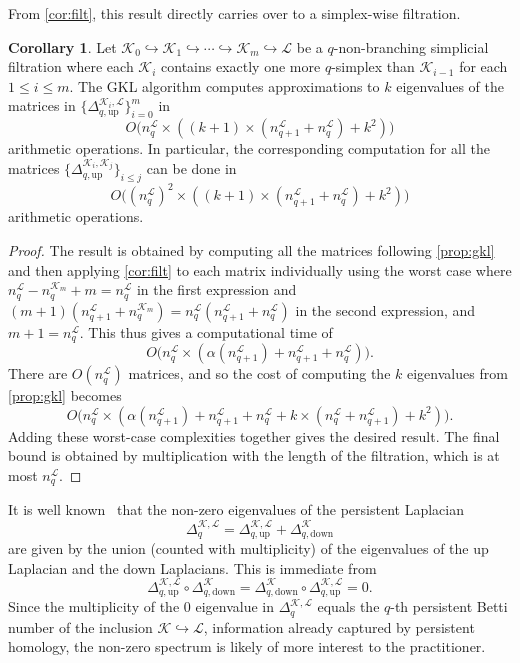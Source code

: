 \documentclass{article}
\theoremstyle{definition}
\newtheorem{corollary}[theorem]{Corollary}
\newcommand{\KK}{\mathcal{K}}
\newcommand{\LL}{\mathcal{L}}
\begin{document}
From \cref{cor:filt}, this result directly carries over to a simplex-wise filtration.

\begin{corollary}\label{cor:filt_complexity} %
Let $\KK_0\hookrightarrow\KK_1 \hookrightarrow\cdots\hookrightarrow \KK_m \hookrightarrow \LL$ be a $q$-non-branching simplicial filtration where each $\KK_i$ contains exactly one more $q$-simplex than $\KK_{i-1}$ for each $1\leq i\leq m$. 
The GKL algorithm computes approximations to $k$ eigenvalues of the matrices in $\{\Delta_{q, \text{up}}^{\KK_i, \LL}\}_{i=0}^{m}$ in
\[
O\Big(n_q^\LL\times \left((k+1)\times (n_{q+1}^\LL+n_q^\LL)+k^2\right)\Big)
\]
arithmetic operations.
In particular, the corresponding computation for all the matrices $\{\Delta_{q, \text{up}}^{\KK_i, \KK_j}\}_{i\leq j}$ can be done in
\[
O\Big((n_q^\LL)^2\times \left((k+1)\times (n_{q+1}^\LL+n_q^\LL)+k^2\right)\Big)
\]
arithmetic operations.
\end{corollary}
\begin{proof}
The result is obtained by computing all the matrices following  \cref{prop:gkl} and then applying \cref{cor:filt} to each matrix individually using the worst case where $n_q^\LL-n_q^{\KK_m}+m = n_q^\LL$ in the first expression and $(m+1)(n_{q+1}^\LL + n_q^{\KK_m}) = n_{q}^\LL(n_{q+1}^\LL + n_q^\LL)$ in the second expression, and $m+1=n_{q}^\LL$. This thus gives a computational time of
\[
O\Big(n_q^\LL\times \left(\alpha(n_{q+1}^\LL) + n_{q+1}^\LL + n_q^\LL\right)\Big).
\]
There are $O(n_q^\LL)$ matrices, and so the cost of computing the $k$ eigenvalues from \cref{prop:gkl} becomes 
\[
O\Big(n_q^\LL\times\left( \alpha(n_{q+1}^\LL)+n_{q+1}^\LL+n_q^\LL+k\times (n_q^\LL+n_{q+1}^\LL)+k^2\right)\Big).
\]
Adding these worst-case complexities together gives the desired result. The final bound is obtained by multiplication with the length of the filtration, which is at most $n_q^\LL$.
\end{proof}

It is well known~\cite[Section 2]{horak2013spectra} that the non-zero eigenvalues of the persistent Laplacian \[\Delta_{q}^{\mathcal{K}, \mathcal{L}} = \Delta_{q, \mathrm{up}}^{\mathcal{K}, \mathcal{L}} + \Delta_{q, \mathrm{down}}^{\mathcal{K}}\]
are given by the union (counted with multiplicity) of the eigenvalues of the up Laplacian and the down Laplacians. This is immediate from 
\[\Delta_{q, \mathrm{up}}^{\mathcal{K}, \mathcal{L}}\circ \Delta_{q, \mathrm{down}}^{\mathcal{K}} = \Delta_{q, \mathrm{down}}^{\mathcal{K}}\circ \Delta_{q, \mathrm{up}}^{\mathcal{K}, \mathcal{L}}=0.\]
Since the multiplicity of the $0$ eigenvalue in $\Delta_{q}^{\mathcal{K}, \mathcal{L}}$ equals the $q$-th persistent Betti number of the inclusion $\KK\hookrightarrow \LL$, information already captured by persistent homology, the non-zero spectrum is likely of more interest to the practitioner.
\end{document}
